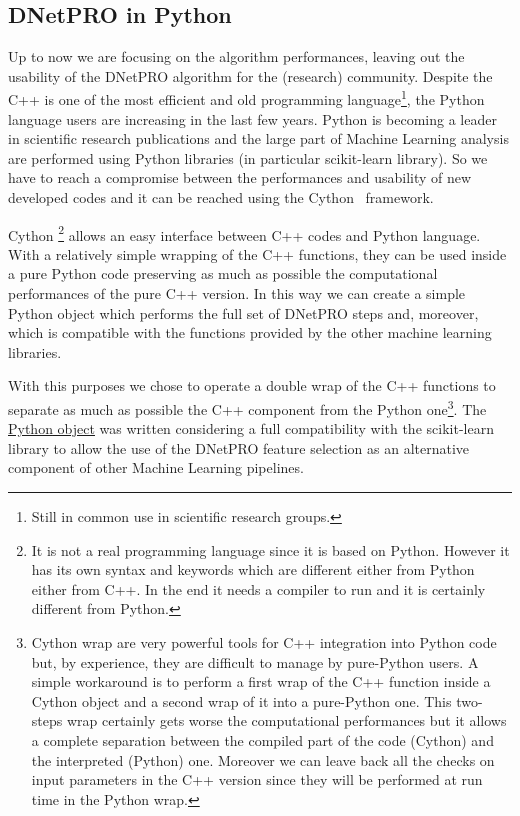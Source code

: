 \documentclass{standalone}
\begin{document}
\subsection[Python wrap]{DNetPRO in Python}\label{implementation:python}

Up to now we are focusing on the algorithm performances, leaving out the usability of the \textsf{DNetPRO} algorithm for the (research) community.
Despite the \textsf{C++} is one of the most efficient and old programming language\footnote{
  Still in common use in scientific research groups.
}, the \textsf{Python} language users are increasing in the last few years.
\textsf{Python} is becoming a leader in scientific research publications and the large part of Machine Learning analysis are performed using \textsf{Python} libraries (in particular \textsf{scikit-learn} library).
So we have to reach a compromise between the performances and usability of new developed codes and it can be reached using the \textsf{Cython}~\cite{behnel2010cython} framework.

Cython \footnote{
  It is not a real programming language since it is based on \textsf{Python}.
  However it has its own syntax and keywords which are different either from \textsf{Python} either from \textsf{C++}.
  In the end it needs a compiler to run and it is certainly different from \textsf{Python}.
} allows an easy interface between \textsf{C++} codes and \textsf{Python} language.
With a relatively simple wrapping of the \textsf{C++} functions, they can be used inside a pure \textsf{Python} code preserving as much as possible the computational performances of the pure \textsf{C++} version.
In this way we can create a simple \textsf{Python} object which performs the full set of \textsf{DNetPRO} steps and, moreover, which is compatible with the functions provided by the other machine learning libraries.

With this purposes we chose to operate a double wrap of the \textsf{C++} functions to separate as much as possible the \textsf{C++} component from the \textsf{Python} one\footnote{
  Cython wrap are very powerful tools for \textsf{C++} integration into \textsf{Python} code but, by experience, they are difficult to manage by pure-\textsf{Python} users.
  A simple workaround is to perform a first wrap of the \textsf{C++} function inside a Cython object and a second wrap of it into a pure-\textsf{Python} one.
  This two-steps wrap certainly gets worse the computational performances but it allows a complete separation between the compiled part of the code (\textsf{Cython}) and the interpreted (\textsf{Python}) one.
  Moreover we can leave back all the checks on input parameters
  in the \textsf{C++} version since they will be performed at run time in the Python wrap.
}.
The \href{https://github.com/Nico-Curti/DNetPRO/blob/master/DNetPRO/DNetPRO.py}{\textsf{Python} object} was written considering a full compatibility with the \textsf{scikit-learn} library to allow the use of the \textsf{DNetPRO} feature selection as an alternative component of other Machine Learning pipelines.
\end{document}
